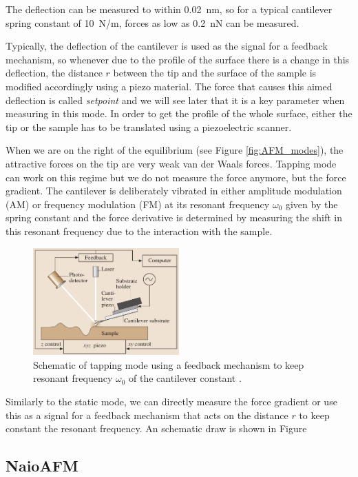 \documentclass[11pt,a4paper]{article}
\begin{document}
The deflection can be measured to within \SI{0.02}{\nm}, so for a typical cantilever spring constant of \SI{10}{\N/\m}, forces as low as \SI{0.2}{\nano\N} can be measured.

Typically, the deflection of the cantilever is used as the signal for a feedback mechanism, so whenever due to the profile of the surface there is a change in this deflection, the distance $r$ between the tip and the surface of the sample is modified accordingly using a piezo material. The force that causes this aimed deflection is called \emph{setpoint} and we will see later that it is a key parameter when measuring in this mode. In order to get the profile of the whole surface, either the tip or the sample has to be translated using a piezoelectric scanner.

When we are on the right of the equilibrium (see Figure \ref{fig:AFM_modes}), the attractive forces on the tip are very weak van der Waals forces. Tapping mode can work on this regime but we do not measure the force anymore, but the force gradient. The cantilever is deliberately vibrated in either amplitude modulation (AM) or frequency modulation (FM) at its resonant frequency $\omega_0$ given by the spring constant and the force derivative is determined by measuring the shift in this resonant frequency due to the interaction with the sample.

\begin{figure}[ht]
\centering
\includegraphics[width=0.5\textwidth]{Tapping_mode}
\caption{Schematic of tapping mode using a feedback mechanism to keep resonant frequency $\omega_0$ of the cantilever constant \cite{Bhushan}.}
\label{fig:Deflection_measurement}
\end{figure}

Similarly to the static mode, we can directly measure the force gradient or use this as a signal for a feedback mechanism that acts on the distance $r$ to keep constant the resonant frequency. An schematic draw is shown in Figure 

\subsection{NaioAFM}
\end{document}
